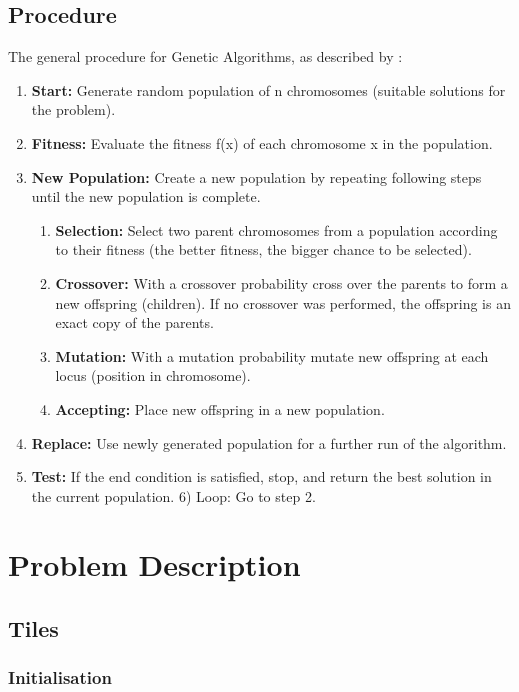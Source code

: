\documentclass[conference]{IEEEtran}
\begin{document}
\subsection{Procedure}
The general procedure for Genetic Algorithms, as described by \cite{ref9}:\\
\begin{enumerate}
    \item  \textbf{Start:} Generate random population of n chromosomes
(suitable solutions for the problem).
    \item \textbf{Fitness:} Evaluate the fitness f(x) of each chromosome x
in the population.
    \item \textbf{New Population:} Create a new population by repeating
following steps until the new population is complete.
    \begin{enumerate}
        \item \textbf{Selection:} Select two parent chromosomes from a
        population according to their fitness (the better fitness,
        the bigger chance to be selected).
        \item \textbf{Crossover:} With a crossover probability cross over the parents to form a new offspring (children). If no
        crossover was performed, the offspring is an exact copy of the parents.
        \item \textbf{Mutation:} With a mutation probability mutate new offspring at each locus (position in chromosome).
        \item \textbf{Accepting:} Place new offspring in a new population.
    \end{enumerate}
    \item \textbf{Replace:} Use newly generated population for a further run of the algorithm.
    \item \textbf{Test:} If the end condition is satisfied, stop, and return the best solution in the current population.
6) Loop: Go to step 2.
\end{enumerate}
\section{Problem Description}
\subsection{Tiles}

\subsubsection{Initialisation}
\end{document}
